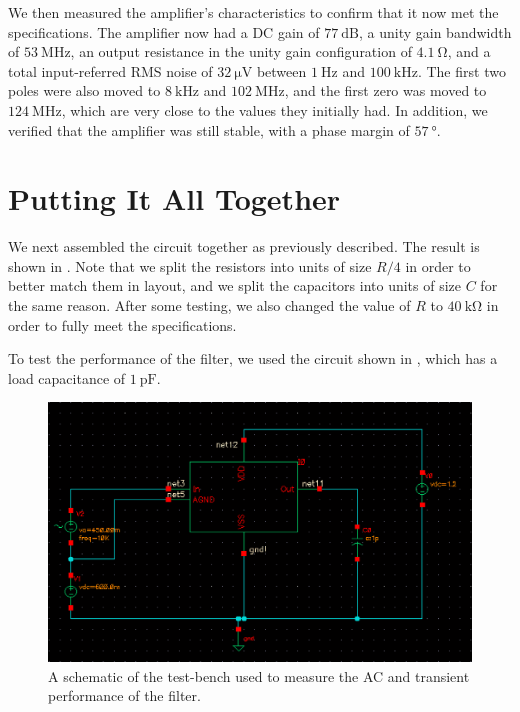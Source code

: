 \documentclass[journal,hidelinks]{IEEEtran}
\begin{document}
We then measured the amplifier's characteristics to confirm that it now met the specifications. The amplifier now had a DC gain of $\SI{77}{\deci\bel}$, a unity gain bandwidth of $\SI{53}{\mega\hertz}$, an output resistance in the unity gain configuration of $\SI{4.1}{\ohm}$, and a total input-referred RMS noise of $\SI{32}{\micro\volt}$ between $\SI{1}{\hertz}$ and $\SI{100}{\kilo\hertz}$. The first two poles were also moved to $\SI{8}{\kilo\hertz}$ and $\SI{102}{\mega\hertz}$, and the first zero was moved to $\SI{124}{\mega\hertz}$, which are very close to the values they initially had. In addition, we verified that the amplifier was still stable, with a phase margin of $\SI{57}{\degree}$.

\section{Putting It All Together}

We next assembled the circuit together as previously described. The result is shown in . Note that we split the resistors into units of size $R/4$ in order to better match them in layout, and we split the capacitors into units of size $C$ for the same reason. After some testing, we also changed the value of $R$ to $\SI{40}{\kilo\ohm}$ in order to fully meet the specifications.

To test the performance of the filter, we used the circuit shown in , which has a load capacitance of $\SI{1}{\pico\farad}$.

\begin{figure}[!htb]
  \centering
  \includegraphics[width=\columnwidth]{schematics/filter_tb.png}
  \caption{A schematic of the test-bench used to measure the AC and transient performance of the filter.}
  \label{fig:filter_tb}
\end{figure}
\end{document}
